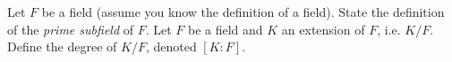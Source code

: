 \documentclass{exam}
\begin{document}
\begin{center}
\end{center}
\vspace*{1em}
\begin{questions}
    \question[3]
        Let $F$ be a field (assume you know the definition of a field). State the definition of the \textit{prime subfield} of $F$.
        \vspace*{10cm}
    \question[2]
        Let $F$ be a field and $K$ an extension of $F$, i.e. $K/F$. Define the degree of $K/F$, denoted $[K:F]$.
\end{questions}
\end{document}
